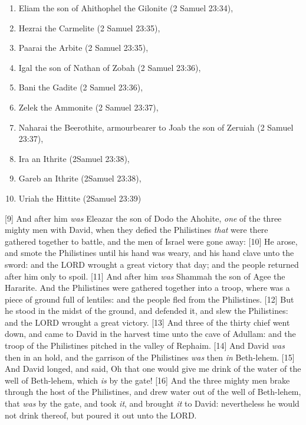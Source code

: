 \begin{enumerate}
\item Eliam the son of Ahithophel the Gilonite  (2 Samuel 23:34),
\item Hezrai the Carmelite (2 Samuel 23:35), 
\item Paarai the Arbite (2 Samuel 23:35),
\item Igal the son of Nathan of Zobah (2 Samuel 23:36), 
\item Bani the Gadite (2 Samuel 23:36),
\item Zelek the Ammonite (2 Samuel 23:37), 
\item Naharai the Beerothite, armourbearer to Joab the son of Zeruiah (2 Samuel 23:37), 
\item Ira an Ithrite (2Samuel 23:38), 
\item Gareb an Ithrite (2Samuel 23:38),
\item Uriah the Hittite (2Samuel 23:39)
\end{enumerate}
[9] \textcolor[rgb]{0.00,0.00,1.00}{And after him \emph{was} Eleazar the son of Dodo the Ahohite, \emph{one} of the three mighty men with David, when they defied the Philistines \emph{that} were there gathered together to battle, and the men of Israel were gone away:}
[10] \textcolor[rgb]{0.00,0.00,1.00}{He arose, and smote the Philistines until his hand was weary, and his hand clave unto the sword: and the LORD wrought a great victory that day; and the people returned after him only to spoil.}
[11] \textcolor[rgb]{0.00,0.00,1.00}{And after him \emph{was} Shammah the son of Agee the Hararite. And the Philistines were gathered together into a troop, where was a piece of ground full of lentiles: and the people fled from the Philistines.}
[12] \textcolor[rgb]{0.00,0.00,1.00}{But he stood in the midst of the ground, and defended it, and slew the Philistines: and the LORD wrought a great victory.}
[13] \textcolor[rgb]{0.00,0.00,1.00}{And three of the thirty chief went down, and came to David in the harvest time unto the cave of Adullam: and the troop of the Philistines pitched in the valley of Rephaim.}
[14] \textcolor[rgb]{0.00,0.00,1.00}{And David \emph{was} then in an hold, and the garrison of the Philistines \emph{was} then \emph{in} Beth-lehem.}
[15] \textcolor[rgb]{0.00,0.00,1.00}{And David longed, and said, Oh that one would give me drink of the water of the well of Beth-lehem, which \emph{is} by the gate!}
[16] \textcolor[rgb]{0.00,0.00,1.00}{And the three mighty men brake through the host of the Philistines, and drew water out of the well of Beth-lehem, that \emph{was} by the gate, and took \emph{it}, and brought \emph{it} to David: nevertheless he would not drink thereof, but poured it out unto the LORD.}
